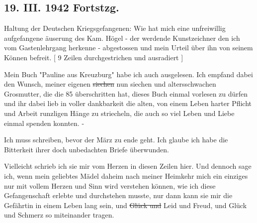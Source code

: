 \subsection{19. III. 1942 Fortstzg.}

Haltung der Deutschen Kriegsgefangenen: Wie hat mich eine unfreiwillig aufgefangene \"{a}userung des Kam. H\"{o}gel - der werdende Kunstzeichner den ich vom Gastenlehrgang herkenne - abgestossen und mein Urteil \"{u}ber ihn von seinem K\"{o}nnen befreit.
{\color{red} [ 9 Zeilen durchgestrichen und ausradiert ] }

Mein Buch "Pauline aus Kreuzburg" habe ich auch ausgelesen.
Ich empfand dabei den Wunsch, meiner eigenen \st{siechen} nun siechen und altersschwachen Grosmutter, die die 85 \"{u}berschritten hat, dieses Buch einmal vorlesen zu d\"{u}rfen und ihr dabei lieb in voller dankbarkeit die alten, von einem Leben harter Pflicht und Arbeit runzligen H\"{a}nge zu striecheln, die auch so viel Leben und Liebe einmal spenden konnten. -

Ich muss schreiben, bevor der M\"{a}rz zu ende geht.
Ich glaube ich habe die Bitterkeit ihrer doch unbedachten Briefe \"{u}berwunden.

Vielleicht schrieb ich sie mir vom Herzen in diesen Zeilen hier.
Und dennoch sage ich, wenn mein geliebtes M\"{a}del daheim nach meiner Heimkehr mich ein einziges nur mit vollem Herzen und Sinn wird verstehen k\"{o}nnen, wie ich diese Gefangenschaft erlebte und durchstehen musste, nur dann kann sie mir die Gef\"{a}hrtin in einem Leben lang sein, und \st{Gl\"{u}ck und} Leid und Freud, und Gl\"{u}ck und Schmerz so miteinander tragen.
\hline

\clearpage
